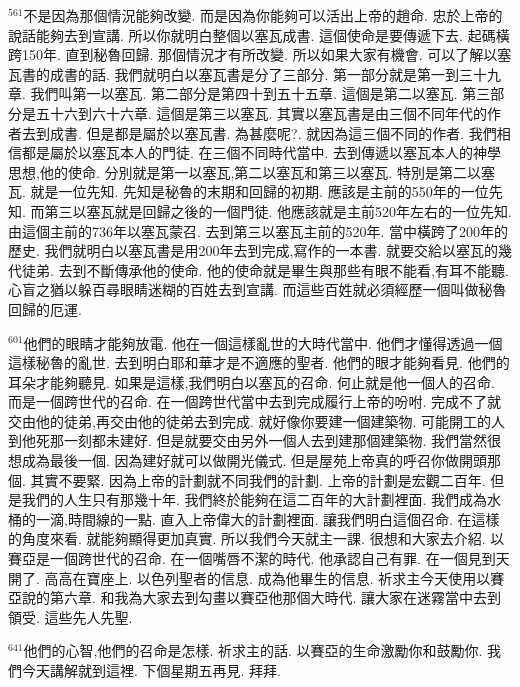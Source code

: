 \documentclass{book}
\begin{document}
$^{561}$不是因為那個情況能夠改變.
而是因為你能夠可以活出上帝的趙命.
忠於上帝的說話能夠去到宣講.
所以你就明白整個以塞瓦成書.
這個使命是要傳遞下去.
起碼橫跨150年.
直到秘魯回歸.
那個情況才有所改變.
所以如果大家有機會.
可以了解以塞瓦書的成書的話.
我們就明白以塞瓦書是分了三部分.
第一部分就是第一到三十九章.
我們叫第一以塞瓦.
第二部分是第四十到五十五章.
這個是第二以塞瓦.
第三部分是五十六到六十六章.
這個是第三以塞瓦.
其實以塞瓦書是由三個不同年代的作者去到成書.
但是都是屬於以塞瓦書.
為甚麼呢?.
就因為這三個不同的作者.
我們相信都是屬於以塞瓦本人的門徒.
在三個不同時代當中.
去到傳遞以塞瓦本人的神學思想,他的使命.
分別就是第一以塞瓦,第二以塞瓦和第三以塞瓦.
特別是第二以塞瓦.
就是一位先知.
先知是秘魯的末期和回歸的初期.
應該是主前的550年的一位先知.
而第三以塞瓦就是回歸之後的一個門徒.
他應該就是主前520年左右的一位先知.
由這個主前的736年以塞瓦蒙召.
去到第三以塞瓦主前的520年.
當中橫跨了200年的歷史.
我們就明白以塞瓦書是用200年去到完成,寫作的一本書.
就要交給以塞瓦的幾代徒弟.
去到不斷傳承他的使命.
他的使命就是畢生與那些有眼不能看,有耳不能聽.
心盲之猶以躲百尋眼睛迷糊的百姓去到宣講.
而這些百姓就必須經歷一個叫做秘魯回歸的厄運.

$^{601}$他們的眼睛才能夠放電.
他在一個這樣亂世的大時代當中.
他們才懂得透過一個這樣秘魯的亂世.
去到明白耶和華才是不適應的聖者.
他們的眼才能夠看見.
他們的耳朵才能夠聽見.
如果是這樣,我們明白以塞瓦的召命.
何止就是他一個人的召命.
而是一個跨世代的召命.
在一個跨世代當中去到完成履行上帝的吩咐.
完成不了就交由他的徒弟,再交由他的徒弟去到完成.
就好像你要建一個建築物.
可能開工的人到他死那一刻都未建好.
但是就要交由另外一個人去到建那個建築物.
我們當然很想成為最後一個.
因為建好就可以做開光儀式.
但是屋苑上帝真的呼召你做開頭那個.
其實不要緊.
因為上帝的計劃就不同我們的計劃.
上帝的計劃是宏觀二百年.
但是我們的人生只有那幾十年.
我們終於能夠在這二百年的大計劃裡面.
我們成為水桶的一滴,時間線的一點.
直入上帝偉大的計劃裡面.
讓我們明白這個召命.
在這樣的角度來看.
就能夠顯得更加真實.
所以我們今天就主一課.
很想和大家去介紹.
以賽亞是一個跨世代的召命.
在一個嘴唇不潔的時代.
他承認自己有罪.
在一個見到天開了.
高高在寶座上.
以色列聖者的信息.
成為他畢生的信息.
祈求主今天使用以賽亞說的第六章.
和我為大家去到勾畫以賽亞他那個大時代.
讓大家在迷霧當中去到領受.
這些先人先聖.

$^{641}$他們的心智,他們的召命是怎樣.
祈求主的話.
以賽亞的生命激勵你和鼓勵你.
我們今天講解就到這裡.
下個星期五再見.
拜拜.
\newpage
\end{document}
